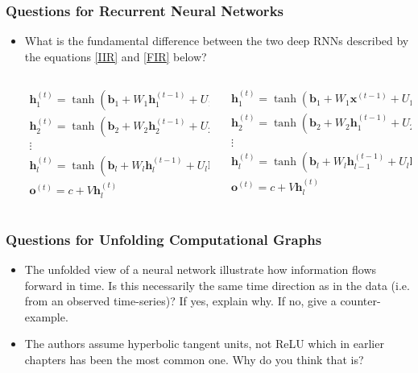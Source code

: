 \documentclass{beamer}
\renewcommand{\vec}[1]{{\boldsymbol{#1}}}
\newcommand{\tvec}[2]{{\vec{#1}^{(#2)}}}
\newcommand{\stvec}[3]{{\vec{#1}_{#2}^{(#3)}}}
\begin{document}
\begin{frame}
\frametitle{Questions for Recurrent Neural Networks}
\begin{itemize}

\item What is the fundamental difference between the two deep RNNs described by the equations \ref{IIR} and \ref{FIR} below?
  \vspace{10mm}
  \scriptsize
  \begin{columns}
      \begin{column}{0.47\textwidth}
  \begin{equation}
    \label{IIR}
\begin{gathered}
  \stvec{h}{1}{t} = \tanh(\vec{b}_1 + W_1 \stvec{h}{1}{t-1} + U_1\tvec{x}{t})\\
  \stvec{h}{2}{t} = \tanh(\vec{b}_2 + W_2 \stvec{h}{2}{t-1} + U_2\stvec{h}{1}{t})\\
  \vdots \\
    \stvec{h}{l}{t} = \tanh(\vec{b}_l + W_l \stvec{h}{l}{t-1} + U_l\stvec{h}{l-1}{t})\\
    \tvec{o}{t} = c + V\stvec{h}{l}{t}
\end{gathered}
\end{equation}
\end{column}

      \begin{column}{0.47\textwidth}
  \begin{equation}
    \label{FIR}
\begin{gathered}
  \stvec{h}{1}{t} = \tanh(\vec{b}_1 + W_1 \tvec{x}{t-1} + U_1\tvec{x}{t})\\
  \stvec{h}{2}{t} = \tanh(\vec{b}_2 + W_2 \stvec{h}{1}{t-1} + U_2\stvec{h}{1}{t})\\
  \vdots \\
    \stvec{h}{l}{t} = \tanh(\vec{b}_l + W_l \stvec{h}{l-1}{t-1} + U_l\stvec{h}{l-1}{t})\\
    \tvec{o}{t} = c + V\stvec{h}{l}{t}
\end{gathered}
\end{equation}
      \end{column}
      \end{columns}
  \end{itemize}

\end{frame}

\begin{frame}
\frametitle{Questions for Unfolding Computational Graphs}
\begin{itemize}
    \item  The unfolded view of a neural network illustrate how information flows forward in time. Is this necessarily the same time direction as in the data (i.e. from an observed time-series)? If yes, explain why. If no, give a counter-example.

    \item The authors assume hyperbolic tangent units, not ReLU which in earlier chapters has been the most common one. Why do you think that is?

\end{itemize}
\end{frame}
\end{document}
